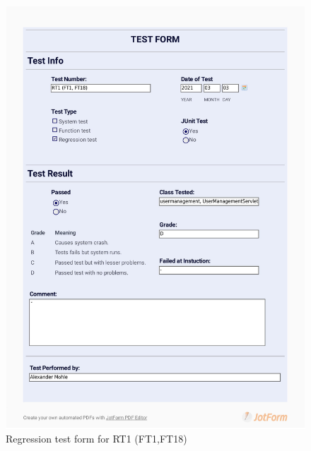 \documentclass{article}
\begin{document}
 \begin{figure}
     \centering
     \includegraphics[width=13cm]{images/2021-03-03_Alexander_RT1(FT1, FT18)-1.jpg}
     \renewcommand\figurename{Figure}
     \caption{Regression test form for RT1 (FT1,FT18)}
     \label{fig:my_label}
 \end{figure}
 
\end{document}
